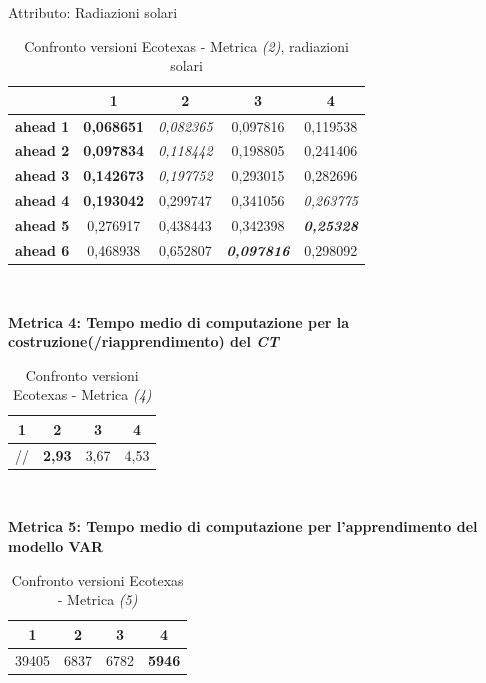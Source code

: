 \documentclass[12pt,a4paper,oneside,openright]{book}
\begin{document}
\medskip

Attributo: Radiazioni solari \\ 

\begin{table}[H]
\centering
\begin{tabular}{|c|c|c|c|c|}
\hline
& 1 & 2 & 3 & 4 \\
\hline
\textbf{ahead 1} & \textbf{0,068651} & \textit{0,082365} & 0,097816 & 0,119538\\
\hline
\textbf{ahead 2} & \textbf{0,097834} & \textit{0,118442} & 0,198805 & 0,241406\\ 
\hline
\textbf{ahead 3} & \textbf{0,142673} & \textit{0,197752} & 0,293015 & 0,282696\\
\hline
\textbf{ahead 4} & \textbf{0,193042} & 0,299747 & 0,341056 & \textit{0,263775}\\ 
\hline
\textbf{ahead 5} & 0,276917 & 0,438443 & 0,342398 & \textit{\textbf{0,25328}}\\
\hline
\textbf{ahead 6} & 0,468938 & 0,652807 & \textit{\textbf{0,097816}} & 0,298092\\ 
\hline
\end{tabular} \\
\caption{Confronto versioni Ecotexas - Metrica \textit{(2)}, radiazioni solari}
\end{table} 

\medskip

\textbf{Metrica 4: Tempo medio di computazione per la costruzione(/riapprendimento) del \textit{CT}}

\medskip

\begin{table}[H]
\centering
\begin{tabular}[H]{|c|c|c|c|}
\hline
1 & 2 & 3 & 4\\
\hline
// & \textbf{2,93} & 3,67 & 4,53\\ 
\hline
\end{tabular} \\
\caption{Confronto versioni Ecotexas - Metrica \textit{(4)}}
\end{table}

\medskip

\textbf{Metrica 5: Tempo medio di computazione per l'apprendimento del modello VAR}

\medskip

\begin{table}[H]
\centering
\begin{tabular}[H]{|c|c|c|c|}
\hline
1 & 2 & 3 & 4\\
\hline
39405 & 6837 & 6782 & \textbf{5946}\\ 
\hline
\end{tabular} \\
\caption{Confronto versioni Ecotexas - Metrica \textit{(5)}}
\end{table}
\end{document}
